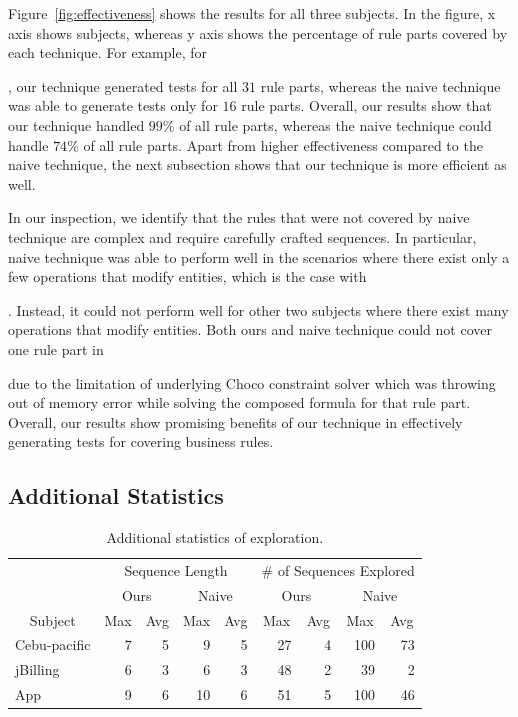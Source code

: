 Figure~\ref{fig:effectiveness} shows the results for all three subjects. 
In the figure, x axis shows subjects, whereas y axis shows the percentage of rule parts
covered by each technique. For example, for \subject{Cebu-pacific},
our technique generated tests for all $31$ rule parts, whereas the naive technique was able
to generate tests only for $16$ rule parts. Overall, our results show 
that our technique handled $99$\% of all rule parts, whereas the naive technique
could handle $74$\% of all rule parts. Apart from higher effectiveness compared
to the naive technique, the next subsection shows that our technique is more efficient
as well.

In our inspection, we identify that the rules that were not covered by naive technique
are complex and require carefully crafted sequences. In particular, naive technique
was able to perform well in the scenarios where there exist only a few operations
that modify entities, which is the case with \subject{jBilling}. Instead, it could not
perform well for other two subjects where there exist many operations that modify
entities. Both ours and naive technique could not cover one rule part in \subject{jBilling}
due to the limitation of underlying Choco constraint solver which was throwing 
out of memory error while solving the composed formula for that rule part. Overall,
our results show promising benefits of our technique in effectively generating
tests for covering business rules.

\subsection{Additional Statistics}


\begin{table}[t]
\caption{Additional statistics of exploration.}
\vspace*{-2ex}
\centering
{\scriptsize
\tabcolsep=3pt
\begin{tabular}{|l|r|r|r|r|r|r|r|r|}
\hline
& \multicolumn{4}{|c|}{Sequence Length} & \multicolumn{4}{|c|}{\# of Sequences Explored} \\
\cline{2-9}
& \multicolumn{2}{|c|}{Ours} & \multicolumn{2}{|c|}{Naive} & \multicolumn{2}{|c|}{Ours} & \multicolumn{2}{|c|}{Naive}  \\
\cline{2-9}
\multicolumn{1}{|c|}{Subject} & \multicolumn{1}{|c|}{Max} & \multicolumn{1}{|c|}{Avg} & \multicolumn{1}{|c|}{Max} & \multicolumn{1}{|c|}{Avg} & \multicolumn{1}{|c|}{Max} & \multicolumn{1}{|c|}{Avg} & \multicolumn{1}{|c|}{Max} & \multicolumn{1}{|c|}{Avg} \\
\hline \hline
Cebu-pacific 	 &  7		& 5 &  9 &  5	 &  27 &  4	&  100 & 73 \\
jBilling		 	 &  6		& 3 &  6 &  3	 &  48 &  2	&  39  &  2 \\
App					 	 &  9		& 6 & 10 &  6	 &  51 &  5	& 100  & 46 \\
\hline
\end{tabular}
}
\label{tab:stats}
\end{table}

